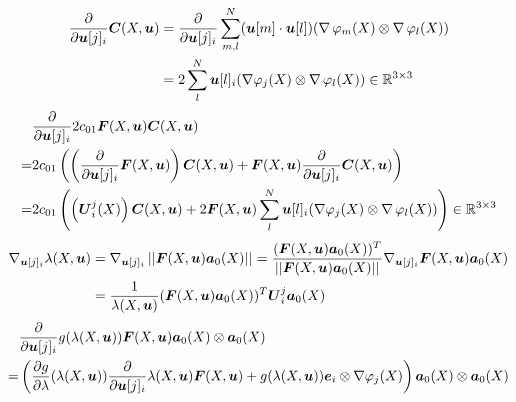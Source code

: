 \begin{align*}
	\d{}{\vu[j]_i}\vC(X,\vu) &= \d{}{\vu[j]_i}\suml{m,l}{N} (\vu[m] \cdot \vu[l])(\divergence\varphi_m(X) \otimes \divergence\varphi_l(X))\\
	&= 2\suml{l}{N} \vu[l]_i(\dpj \otimes \divergence\varphi_l(X))\in\R^{3\times 3}
\end{align*}
\begin{align*}
	&\d{}{\vu[j]_i}2c_{01}\vF(X,\vu)\vC(X,\vu)\\
	=& 2c_{01}\left(\left(\d{}{\vu[j]_i}\vF(X,\vu)\right)\vC(X,\vu) + \vF(X,\vu)\d{}{\vu[j]_i}\vC(X,\vu)\right)\\
	=& 2c_{01}\left(\left(\vU^j_i(X)\right)\vC(X,\vu)
	+ 2\vF(X,\vu)\suml{l}{N} \vu[l]_i(\dpj \otimes \divergence\varphi_l(X))\right)\in\R^{3\times 3}
\end{align*}
\begin{align*}
	\nabla_{\vu[j]_i}\la(X,\vu) &= \nabla_{\vu[j]_i}\no{\vF(X,\vu)\va_0(X)} = \frac{(\vF(X,\vu)\va_0(X))^T}{\no{\vF(X,\vu)\va_0(X)}}\nabla_{\vu[j]_i}\vF(X,\vu)\va_0(X)\\
	&= \frac{1}{\la(X,\vu)}(\vF(X,\vu)\va_0(X))^T\vU_i^j\va_0(X)
\end{align*}
\begin{align*}
	  & \d{}{\vu[j]_i} g(\la(X,\vu))\vF(X,\vu)\va_0(X)\otimes\va_0(X)\\
	 =& \left( \d{g}{\la}(\la(X,\vu))\d{}{\vu[j]_i}\la(X,\vu)\vF(X,\vu) + g(\la(X,\vu))\ve_i\otimes\dpj\right)\va_0(X)\otimes\va_0(X) 
\end{align*}
